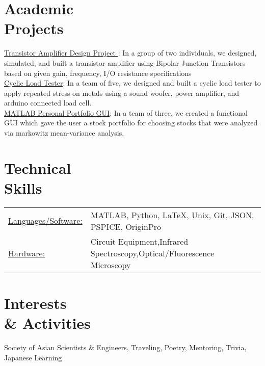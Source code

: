 \documentclass[margin]{res}
\begin{document}
\begin{resume}
\begin{itemize}
		 \end{itemize}
		

\section{Academic \\ Projects} 
\underline{Transistor Amplifier Design Project }: In a group of two individuals, we designed, simulated, and built a transistor amplifier using Bipolar Junction Transistors based on given gain, frequency, I/O resistance specifications  \\
\underline{Cyclic Load Tester}: In a team of five, we designed and built a cyclic load tester to apply repeated stress on metals using a sound woofer, power amplifier, and arduino connected load cell. \\
\underline{MATLAB Personal Portfolio GUI}: In a team of three, we created a functional GUI which gave the user a stock portfolio for choosing stocks that were analyzed via markowitz mean-variance analysis. 
 

\section{Technical \\ Skills}
   \begin{tabular}{l p{4.5in}}
    \underline{Languages/Software:} & MATLAB, Python, LaTeX, Unix, Git, JSON, PSPICE, OriginPro \\
     \underline{Hardware:} & Circuit Equipment,Infrared Spectroscopy,Optical/Fluorescence Microscopy \\
 \end{tabular}
 
\section{Interests \\ \& Activities}
Society of Asian Scientists \& Engineers, Traveling, Poetry, Mentoring, Trivia, Japanese Learning
\end{resume} 
\end{document}
